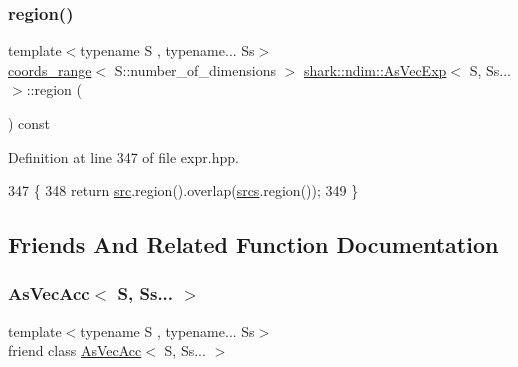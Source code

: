 \subsubsection{\texorpdfstring{region()}{region()}}
{\footnotesize\ttfamily template$<$typename S , typename... Ss$>$ \\
\hyperlink{structshark_1_1ndim_1_1coords__range}{coords\+\_\+range}$<$ S\+::number\+\_\+of\+\_\+dimensions $>$ \hyperlink{classshark_1_1ndim_1_1_as_vec_exp}{shark\+::ndim\+::\+As\+Vec\+Exp}$<$ S, Ss... $>$\+::region (\begin{DoxyParamCaption}{ }\end{DoxyParamCaption}) const\hspace{0.3cm}{\ttfamily [inline]}}



Definition at line 347 of file expr.\+hpp.


\begin{DoxyCode}
347                                                                                    \{
348             \textcolor{keywordflow}{return} \hyperlink{classshark_1_1ndim_1_1_as_vec_exp_3_01_s_00_01_ss_8_8_8_01_4_a194abf424b594c3e86a42aa114700e51}{src}.region().overlap(\hyperlink{classshark_1_1ndim_1_1_as_vec_exp_3_01_s_00_01_ss_8_8_8_01_4_aed5717d0b843d3fbe4c99a13109fbb6b}{srcs}.region());
349         \}
\end{DoxyCode}


\subsection{Friends And Related Function Documentation}
\hypertarget{classshark_1_1ndim_1_1_as_vec_exp_3_01_s_00_01_ss_8_8_8_01_4_ab3101340c739f2a1cc97a85007fb6caa}{}\label{classshark_1_1ndim_1_1_as_vec_exp_3_01_s_00_01_ss_8_8_8_01_4_ab3101340c739f2a1cc97a85007fb6caa} 
\subsubsection{\texorpdfstring{As\+Vec\+Acc$<$ S, Ss... $>$}{AsVecAcc< S, Ss... >}}
{\footnotesize\ttfamily template$<$typename S , typename... Ss$>$ \\
friend class \hyperlink{classshark_1_1ndim_1_1_as_vec_acc}{As\+Vec\+Acc}$<$ S, Ss... $>$\hspace{0.3cm}{\ttfamily [friend]}}



